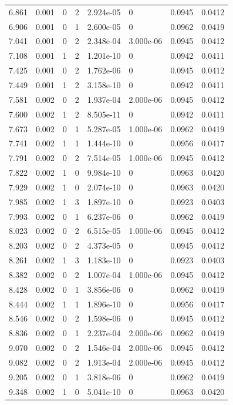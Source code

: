\documentclass[preview]{standalone}
\begin{document}
{{{\begin{tabular}{L{1.2cm}C{1.2cm} C{0.3cm}C{0.5cm} C{1.4cm}C{1.4cm} C{1.4cm}C{1.4cm}}
  6.861  &  0.001  & 0     &  2 &  2.924e-05  & 0  & 0.0945 &  0.0412   \\ 
  6.906  &  0.001  & 0     &  1 &  2.600e-05  & 0  & 0.0962 &  0.0419   \\ 
  7.041  &  0.001  & 0     &  2 &  2.348e-04  & 3.000e-06  & 0.0945 &  0.0412   \\ 
  7.108  &  0.001  & 1     &  2 &  1.201e-10  & 0  & 0.0942 &  0.0411   \\ 
  7.425  &  0.001  & 0     &  2 &  1.762e-06  & 0  & 0.0945 &  0.0412   \\ 
  7.449  &  0.001  & 1     &  2 &  3.158e-10  & 0  & 0.0942 &  0.0411   \\ 
  7.581  &  0.002  & 0     &  2 &  1.937e-04  & 2.000e-06  & 0.0945 &  0.0412   \\ 
  7.600  &  0.002  & 1     &  2 &  8.505e-11  & 0  & 0.0942 &  0.0411   \\ 
  7.673  &  0.002  & 0     &  1 &  5.287e-05  & 1.000e-06  & 0.0962 &  0.0419   \\ 
  7.741  &  0.002  & 1     &  1 &  1.444e-10  & 0  & 0.0956 &  0.0417   \\ 
  7.791  &  0.002  & 0     &  2 &  7.514e-05  & 1.000e-06  & 0.0945 &  0.0412   \\ 
  7.822  &  0.002  & 1     &  0 &  9.984e-10  & 0  & 0.0963 &  0.0420   \\ 
  7.929  &  0.002  & 1     &  0 &  2.074e-10  & 0  & 0.0963 &  0.0420   \\ 
  7.985  &  0.002  & 1     &  3 &  1.897e-10  & 0  & 0.0923 &  0.0403   \\ 
  7.993  &  0.002  & 0     &  1 &  6.237e-06  & 0  & 0.0962 &  0.0419   \\ 
  8.023  &  0.002  & 0     &  2 &  6.515e-05  & 1.000e-06  & 0.0945 &  0.0412   \\ 
  8.203  &  0.002  & 0     &  2 &  4.373e-05  & 0  & 0.0945 &  0.0412   \\ 
  8.261  &  0.002  & 1     &  3 &  1.183e-10  & 0  & 0.0923 &  0.0403   \\ 
  8.382  &  0.002  & 0     &  2 &  1.007e-04  & 1.000e-06  & 0.0945 &  0.0412   \\ 
  8.428  &  0.002  & 0     &  1 &  3.856e-06  & 0  & 0.0962 &  0.0419   \\ 
  8.444  &  0.002  & 1     &  1 &  1.896e-10  & 0  & 0.0956 &  0.0417   \\ 
  8.546  &  0.002  & 0     &  2 &  1.598e-06  & 0  & 0.0945 &  0.0412   \\ 
  8.836  &  0.002  & 0     &  1 &  2.237e-04  & 2.000e-06  & 0.0962 &  0.0419   \\ 
  9.070  &  0.002  & 0     &  2 &  1.546e-04  & 2.000e-06  & 0.0945 &  0.0412   \\ 
  9.082  &  0.002  & 0     &  2 &  1.913e-04  & 2.000e-06  & 0.0945 &  0.0412   \\ 
  9.205  &  0.002  & 0     &  1 &  3.818e-06  & 0  & 0.0962 &  0.0419   \\ 
  9.348  &  0.002  & 1     &  0 &  5.041e-10  & 0  & 0.0963 &  0.0420   \\ 
\hline 
\end{tabular} 

}}}
\end{document}
